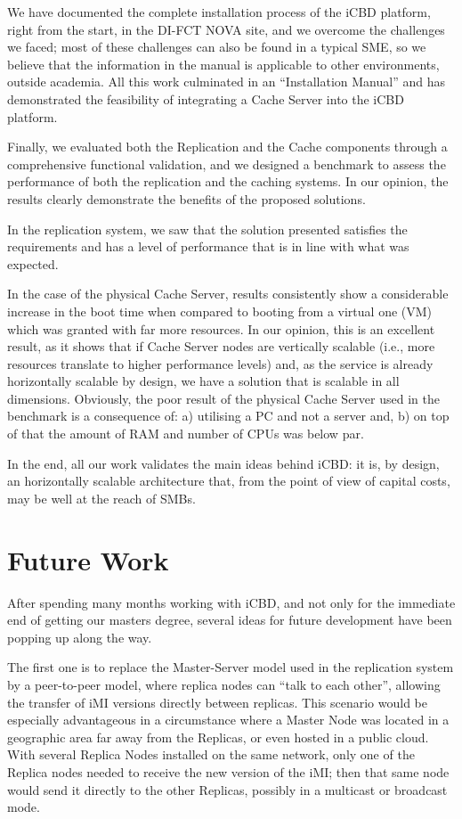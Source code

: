 We have documented the complete installation process of the iCBD platform, right from the start, in the DI-FCT NOVA site, and we overcome the challenges we faced; most of these challenges can also be found in a typical SME, so we believe that the information in the manual is applicable to other environments, outside academia. All this work culminated in an “Installation Manual” and has demonstrated the feasibility of integrating a Cache Server into the iCBD platform.

Finally, we evaluated both the Replication and the Cache components through a comprehensive functional validation, and we designed a benchmark to assess the performance of both the replication and the caching systems. In our opinion, the results clearly demonstrate the benefits of the proposed solutions.

In the replication system, we saw that the solution presented satisfies the requirements and has a level of performance that is in line with what was expected.

In the case of the physical Cache Server, results consistently show a considerable increase in the boot time when compared to booting from a virtual one (VM) which was granted with far more resources. In our opinion, this is an excellent result, as it shows that if Cache Server nodes are vertically scalable (i.e., more resources translate to higher performance levels) and, as the service is already horizontally scalable by design, we have a solution that is scalable in all dimensions. Obviously, the poor result of the physical Cache Server used in the benchmark is a consequence of: a) utilising a PC and not a server and, b) on top of that the amount of RAM and number of CPUs was below par.

In the end, all our work validates the main ideas behind iCBD: it is, by design, an horizontally scalable architecture that, from the point of view of capital costs, may be well at the reach of SMBs. 

\section{Future Work}
\label{sec:con_future_work}

After spending many months working with iCBD, and not only for the immediate end of getting our masters degree, several ideas for future development have been popping up along the way.

The first one is to replace the Master-Server model used in the replication system by a peer-to-peer model, where replica nodes can “talk to each other”, allowing the transfer of iMI versions directly between replicas. This scenario would be especially advantageous in a circumstance where a Master Node was located in a geographic area far away from the Replicas, or even hosted in a public cloud. With several Replica Nodes installed on the same network, only one of the Replica nodes needed to receive the new version of the iMI; then that same node would send it directly to the other Replicas, possibly in a multicast or broadcast mode.

